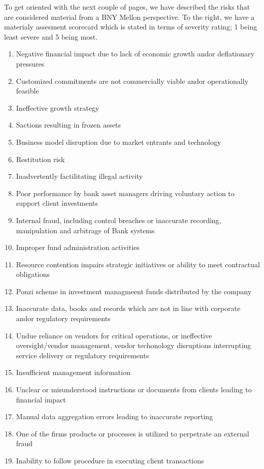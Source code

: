 To get oriented with the next couple of pages, we have described the risks that
are considered material from a BNY Mellon perspective. To the right, we have a
materialy assesment scorecard which is stated in terms of severity rating; 1
being least severe and 5 being most.

\begin{enumerate}
  \item Negative financial impact due to lack of economic growth and\/or
  deflationary pressures
  \item Customized commitments are not commercially viable and\/or operationally
  feasible
  \item Ineffective growth strategy
  \item Sactions resulting in frozen assets
  \item Business model disruption due to market entrants and technology
  \item Restitution risk
  \item Inadvertently factilitating illegal activity
  \item Poor performance by bank asset managers driving voluntary action to
  support client investments
  \item Internal fraud, including control breaches or inaccurate recording,
  manipulation and arbitrage of Bank systems
  \item Improper fund administration activities
  \item Resource contention impairs strategic initiatives or ability to meet
  contractual obligations
  \item Ponzi scheme in investment managmeent funds distributed by the company
  \item Inaccurate data, books and records which are not in line with corporate
  and\/or regulatory requirements
  \item Undue reliance on vendors for critical operations, or ineffective
  oversight/vendor management, vendor techonology disruptions interrupting
  service delivery or regulatory requirements
  \item Insufficient management information
  \item Unclear or misunderstood instructions or documents from clients leading
  to financial impact
  \item Manual data aggregation errors leading to inaccurate reporting
  \item One of the firms products or processes is utilized to perpetrate an
  external fraud
  \item Inability to follow procedure in executing client transactions

\end{enumerate}
